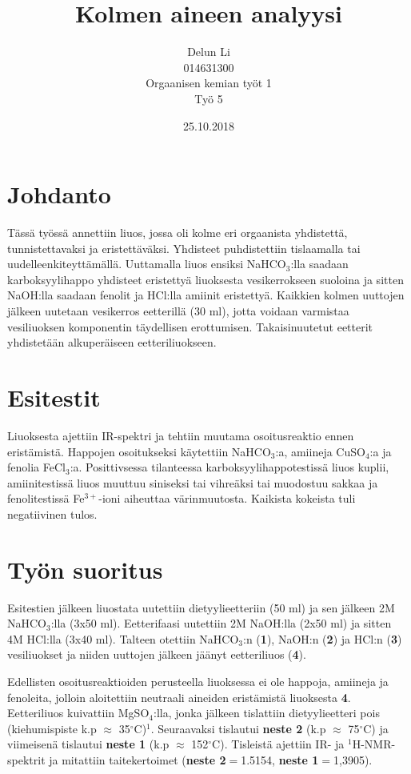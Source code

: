 \documentclass[11pt,a4paper]{article}
\title{Kolmen aineen analyysi}
\author{Delun Li\\014631300\\Orgaanisen kemian työt 1\\Työ 5}
\date{25.10.2018}
\begin{document}
\maketitle

\pagebreak


\section{Johdanto}

Tässä työssä annettiin liuos, jossa oli kolme eri orgaanista yhdistettä, tunnistettavaksi ja eristettäväksi.  Yhdisteet puhdistettiin tislaamalla tai uudelleenkiteyttämällä. Uuttamalla liuos ensiksi NaHCO$_3$:lla saadaan karboksyylihappo yhdisteet eristettyä liuoksesta vesikerrokseen suoloina ja sitten NaOH:lla saadaan fenolit ja HCl:lla amiinit eristettyä. Kaikkien kolmen uuttojen jälkeen uutetaan vesikerros eetterillä (30 ml), jotta voidaan varmistaa vesiliuoksen komponentin täydellisen erottumisen. Takaisinuutetut eetterit yhdistetään alkuperäiseen eetteriliuokseen.

\section{Esitestit}

Liuoksesta ajettiin IR-spektri ja tehtiin muutama osoitusreaktio ennen eristämistä. Happojen osoitukseksi käytettiin NaHCO$_3$:a, amiineja CuSO$_4$:a ja fenolia FeCl$_3$:a. Posittivsessa tilanteessa karboksyylihappotestissä liuos kuplii, amiinitestissä liuos muuttuu siniseksi tai vihreäksi tai muodostuu sakkaa ja fenolitestissä Fe$^{3+}$-ioni aiheuttaa värinmuutosta. Kaikista kokeista tuli negatiivinen tulos. 


\section{Työn suoritus}

Esitestien jälkeen liuostata uutettiin dietyylieetteriin (50 ml) ja sen jälkeen 2M NaHCO$_3$:lla (3x50 ml). Eetterifaasi uutettiin 2M NaOH:lla (2x50 ml) ja sitten 4M HCl:lla (3x40 ml). Talteen otettiin NaHCO$_3$:n (\textbf{1}), NaOH:n (\textbf{2}) ja HCl:n (\textbf{3}) vesiliuokset ja niiden uuttojen jälkeen jäänyt eetteriliuos (\textbf{4}).

Edellisten osoitusreaktioiden perusteella liuoksessa ei ole happoja, amiineja ja fenoleita, jolloin aloitettiin neutraali aineiden eristämistä liuoksesta \textbf{4}. Eetteriliuos kuivattiin MgSO$_4$:lla, jonka jälkeen tislattiin dietyylieetteri pois (kiehumispiste k.p $\approx$ 35$^\circ$C)$^1$. Seuraavaksi tislautui \textbf{neste 2} (k.p $\approx$ 75$^\circ$C) ja viimeisenä tislautui \textbf{neste 1} (k.p $\approx$ 152$^\circ$C). Tisleistä ajettiin IR- ja $^1$H-NMR-spektrit ja mitattiin taitekertoimet (\textbf{neste 2}$=$1.5154, \textbf{neste 1}$=$1,3905).
\end{document}
